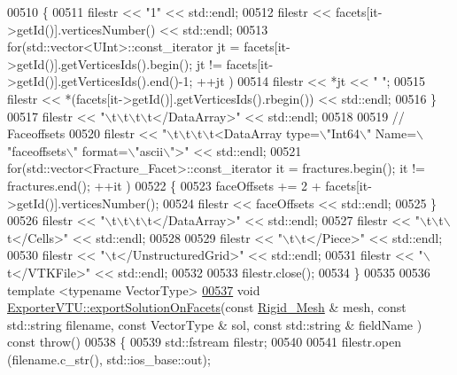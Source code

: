\begin{DoxyCode}
00510     \{
00511         filestr << \textcolor{stringliteral}{"1"} << std::endl;
00512         filestr << facets[it->getId()].verticesNumber() << std::endl;
00513         \textcolor{keywordflow}{for}(std::vector<UInt>::const\_iterator jt = facets[it->getId()].getVerticesIds().begin(); jt != 
      facets[it->getId()].getVerticesIds().end()-1; ++jt )
00514             filestr << *jt << \textcolor{stringliteral}{" "};
00515         filestr << *(facets[it->getId()].getVerticesIds().rbegin()) << std::endl;
00516     \}
00517     filestr << \textcolor{stringliteral}{"\(\backslash\)t\(\backslash\)t\(\backslash\)t\(\backslash\)t</DataArray>"} << std::endl;
00518 
00519     \textcolor{comment}{//  Faceoffsets}
00520     filestr << \textcolor{stringliteral}{"\(\backslash\)t\(\backslash\)t\(\backslash\)t\(\backslash\)t<DataArray type=\(\backslash\)"Int64\(\backslash\)" Name=\(\backslash\)"faceoffsets\(\backslash\)" format=\(\backslash\)"ascii\(\backslash\)">"} << std::endl;
00521     \textcolor{keywordflow}{for}(std::vector<Fracture\_Facet>::const\_iterator it = fractures.begin(); it != fractures.end(); ++it )
00522     \{
00523         faceOffsets += 2 + facets[it->getId()].verticesNumber();
00524         filestr << faceOffsets << std::endl;
00525     \}
00526     filestr << \textcolor{stringliteral}{"\(\backslash\)t\(\backslash\)t\(\backslash\)t\(\backslash\)t</DataArray>"} << std::endl;
00527     filestr << \textcolor{stringliteral}{"\(\backslash\)t\(\backslash\)t\(\backslash\)t</Cells>"} << std::endl;
00528 
00529     filestr << \textcolor{stringliteral}{"\(\backslash\)t\(\backslash\)t</Piece>"} << std::endl;
00530     filestr << \textcolor{stringliteral}{"\(\backslash\)t</UnstructuredGrid>"} << std::endl;
00531     filestr << \textcolor{stringliteral}{"\(\backslash\)t</VTKFile>"} << std::endl;
00532 
00533     filestr.close();
00534 \}
00535 
00536 \textcolor{keyword}{template} <\textcolor{keyword}{typename} VectorType>
\hypertarget{ExportVTU_8hpp_source.tex_l00537}{}\hyperlink{classFVCode3D_1_1ExporterVTU_a3dd6650210988750d8c057f68a0f016d}{00537} \textcolor{keywordtype}{void} \hyperlink{classFVCode3D_1_1ExporterVTU_a3dd6650210988750d8c057f68a0f016d}{ExporterVTU::exportSolutionOnFacets}(\textcolor{keyword}{const} 
      \hyperlink{classFVCode3D_1_1Rigid__Mesh}{Rigid\_Mesh} & mesh, \textcolor{keyword}{const} std::string filename, \textcolor{keyword}{const} VectorType & sol, \textcolor{keyword}{const} std::string & 
      fieldName ) \textcolor{keyword}{const} \textcolor{keywordflow}{throw}()
00538 \{
00539     std::fstream filestr;
00540 
00541     filestr.open (filename.c\_str(), std::ios\_base::out);

\end{DoxyCode}
